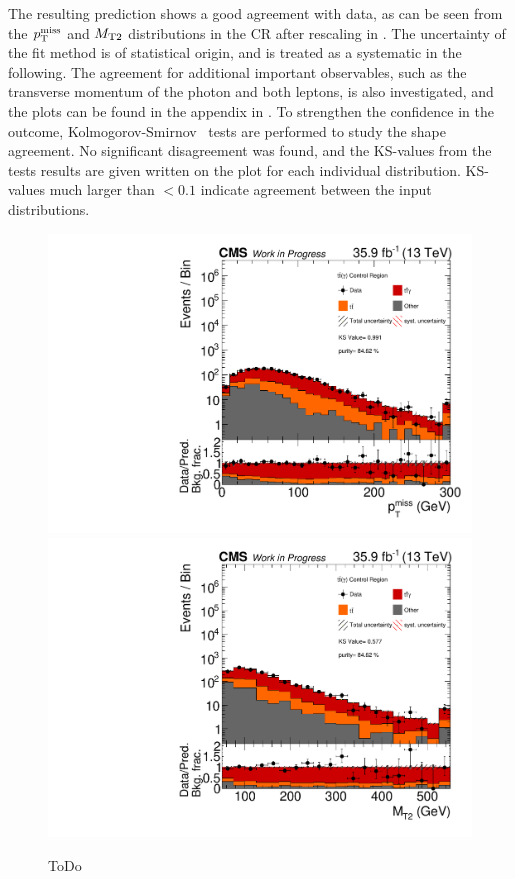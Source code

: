 The resulting prediction shows a good agreement with data, as can be seen from the $p_{\mathrm{T}}^\text{miss}$ and $M_{\mathrm{T2}}$ distributions in the CR after rescaling in . The uncertainty of the fit method is of statistical origin, and is treated as a systematic in the following. The agreement for additional important observables, such as the transverse momentum of the photon and both leptons, is also investigated, and the plots can be found in the appendix in . To strengthen the confidence in the outcome, Kolmogorov-Smirnov~\cite{KS} tests are performed to study the shape agreement. No significant disagreement was found, and the KS-values from the tests results are given written on the plot for each individual distribution. KS-values much larger than $<0.1$ indicate agreement between the input distributions.\\
\begin{figure}[htb]
 \centering
 \includegraphics[width=\pairwidth]{figures/plots_CR_tt/CRTT_EM_nom_met_log}
 \includegraphics[width=\pairwidth]{figures/plots_CR_tt/CRTT_EM_nom_mt2_log}
 \caption{ToDo}
 \label{fig:CRTT}
\end{figure}
